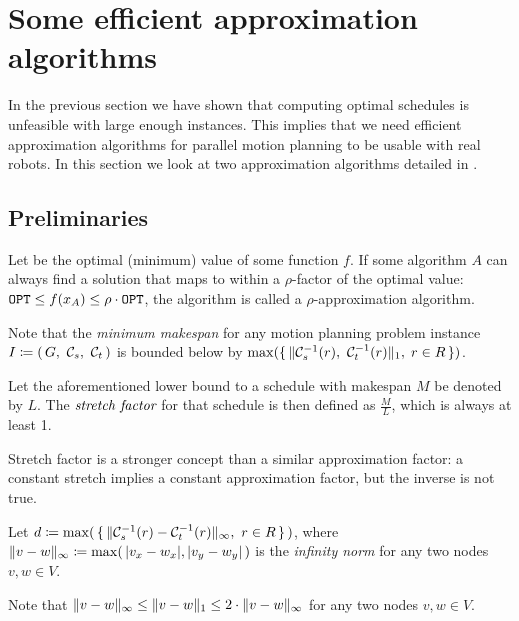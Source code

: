 \section{Some efficient approximation algorithms}\label{chapter:constant_stretch}

In the previous section we have shown that computing optimal schedules is unfeasible with large enough instances.
This implies that we need efficient approximation algorithms for parallel motion planning to be usable with real robots.
In this section we look at two approximation algorithms detailed in \cite{siamcomp/DemaineFKMS19}.

\subsection{Preliminaries}

Let  be the optimal (minimum) value of some function \(f\).
If some algorithm \(A\) can always find a solution that maps to within a \(\rho\)-factor of the optimal value: \(\texttt{OPT} \leq f(x_A) \leq \rho \cdot \texttt{OPT}\), the algorithm is called a \(\rho\)-approximation algorithm.

Note that the \emph{minimum makespan} for any motion planning problem instance \(I \coloneqq \parens{G,\ \conf{s},\ \conf{t}}\) is bounded below by \(\max(\set{\lVert\ensuremath{\mathcal{C}_{s}}^{-1}(r),\ \ensuremath{\mathcal{C}_{t}}^{-1}(r)\rVert_1, \; r \in R})\).

\begin{definition}\label{def:stretch_factor}
	Let the aforementioned lower bound to a schedule with makespan \(M\) be denoted by \(L\).
	The \(\emph{stretch factor}\) for that schedule is then defined as \(\frac M L \), which is always at least 1. 
\end{definition}

\begin{remark}
	Stretch factor is a stronger concept than a similar approximation factor: a constant stretch implies a constant approximation factor, but the inverse is not true.
\end{remark}

Let \(d \coloneqq \max(\, \set{\lVert\ensuremath{\mathcal{C}_{s}}^{-1}(r) - \ensuremath{\mathcal{C}_{t}}^{-1}(r)\rVert_\infty,\ r \in R } \,)\), where \(\lVert v - w\rVert_\infty \coloneqq \max(\, \lvert v_x - w_x\rvert, \lvert v_y - w_y\rvert \,)\) is the \emph{infinity norm} for any two nodes \(v, w \in V\).

\begin{remark}\label{rem:d_and_L}
	Note that \(\lVert v - w\rVert_\infty \leq \lVert v - w\rVert_1 \leq 2\cdot \lVert v - w\rVert_\infty\) for any two nodes \(v, w \in V\).
\end{remark}











